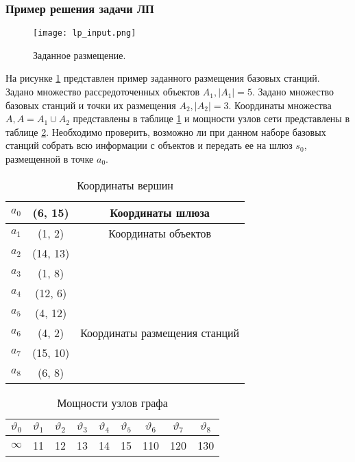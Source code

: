 \subsubsection{Пример решения задачи ЛП}


\begin{figure}[h!]
    \centering
     \texttt{[image: lp\_input.png]}
  \caption{Заданное размещение.}
  \label{fig:part3_lp_input}
  \end{figure}

На рисунке \cref{fig:part3_lp_input} представлен пример заданного размещения базовых станций. Задано множество рассредоточенных объектов $A_1, |A_1| = 5$. Задано множество базовых станций и точки их размещения $A_2, |A_2| = 3$. Координаты множества $A, A = A_1 \cup A_2 $ представлены в таблице \cref{tab:part3_lp_input_coordinates} и мощности узлов сети представлены в таблице \cref{tab:part3_lp_intensity}. Необходимо проверить, возможно ли при данном наборе базовых станций собрать всю информации с объектов  и передать ее на шлюз $s_0$, размещенной в точке $a_0$. 

\begin{table}[h!]\centering
    \begin{tabular}{| c| c|c |}\hline
        $a_0$& (6, 15)& Координаты шлюза \\
        \hline
        \hline
        $a_1$&(1, 2) & Координаты объектов \\
        $a_2$&(14, 13) &  \\
        $a_3$&(1, 8) & \\
        $a_4$&(12, 6) &  \\
        $a_5$&(4, 12) &  \\
        \hline
        \hline
        $a_6$&(4, 2) & Координаты размещения станций \\
        $a_7$&(15, 10) & \\
        $a_8$&(6, 8) & \\
        \hline
    \end{tabular}\caption{Координаты вершин}\label{tab:part3_lp_input_coordinates}
\end{table}

\begin{table}[h!]\centering
\begin{tabular}{| c| c c c c c |c c c|}\hline
    $\vartheta_0$& $\vartheta_1$& $\vartheta_2$& $\vartheta_3$& $\vartheta_4$& $\vartheta_5$& $\vartheta_6$& $\vartheta_7$ & $\vartheta_8$\\
    \hline
    \hline
    $\infty$ & 11&	12&	13&	14&	15&	110& 120 & 130\\
    \hline
\end{tabular}\caption{Мощности узлов графа}\label{tab:part3_lp_intensity}
\end{table}
   

